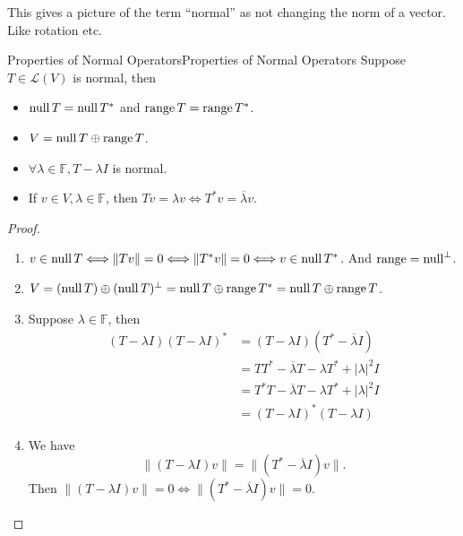 \documentclass[../main.tex]{subfiles}
\begin{document}
\begin{remark}
This gives a picture of the term ``normal'' as not changing the norm of a vector. Like rotation etc.
\end{remark}

\begin{proposition}{Properties of Normal Operators}{Properties of Normal Operators}
Suppose $T\in \mathscr{L}(V)$ is normal, then
\begin{itemize}
\item $\operatorname{null} T=\operatorname{null} T^*$ and $\operatorname{range} T=\operatorname{range} T^*$.
\item $V = \operatorname{null} T \oplus \operatorname{range} T$.
\item $\forall \lambda\in \mathbb{F},T-\lambda I$ is normal.
\item If $v\in V,\lambda\in \mathbb{F}$, then $Tv=\lambda v \Longleftrightarrow T^*v = \overline{\lambda}v$.
\end{itemize}
\end{proposition}
\begin{proof}
\begin{enumerate}
	\item $v\in \operatorname{null} T \Longleftrightarrow \|Tv\|=0 \Longleftrightarrow \|T^*v\|=0 \Longleftrightarrow v\in \operatorname{null} T^*$. And $\operatorname{range} = \operatorname{null} ^{\perp}$.
	\item $V = (\operatorname{null} T)\oplus (\operatorname{null} T)^{\perp} = \operatorname{null} T \oplus \operatorname{range} T^* = \operatorname{null} T \oplus \operatorname{range} T$.
	\item Suppose $\lambda\in \mathbb{F}$, then
\begin{equation*}
\begin{aligned}
(T-\lambda I)(T-\lambda I)^* &= (T-\lambda I)(T^*- \overline{\lambda}I)\\
&= T T^* - \overline{\lambda}T- \lambda T^* + \left|\lambda\right|^2 I\\
&= T^*T - \overline{\lambda}T - \lambda T^* + \left|\lambda\right|^2I\\
&= (T- \lambda I)^*(T-\lambda I)
\end{aligned}
\end{equation*}
\item We have
	\begin{equation*}
	\|(T-\lambda I)v\| = \|(T^*-\overline{\lambda}I)v\|.
	\end{equation*}
Then $\|(T- \lambda I)v\| =0 \Longleftrightarrow \|(T^*-\overline{\lambda}I)v\|=0$.
\end{enumerate}
\end{proof}
\end{document}
